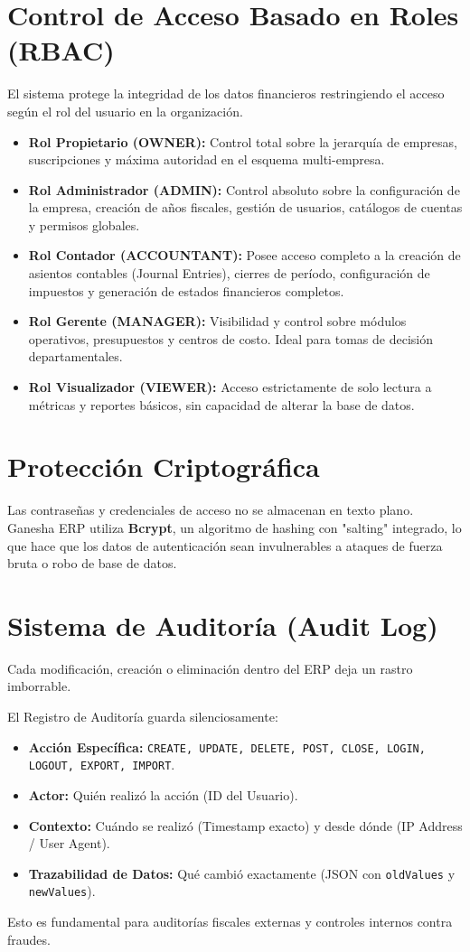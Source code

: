 \documentclass[12pt, a4paper, oneside]{book}
\begin{document}
\section{Control de Acceso Basado en Roles (RBAC)}
El sistema protege la integridad de los datos financieros restringiendo el acceso según el rol del usuario en la organización.
\begin{itemize}
    \item \textbf{Rol Propietario (OWNER):} Control total sobre la jerarquía de empresas, suscripciones y máxima autoridad en el esquema multi-empresa.
    \item \textbf{Rol Administrador (ADMIN):} Control absoluto sobre la configuración de la empresa, creación de años fiscales, gestión de usuarios, catálogos de cuentas y permisos globales.
    \item \textbf{Rol Contador (ACCOUNTANT):} Posee acceso completo a la creación de asientos contables (Journal Entries), cierres de período, configuración de impuestos y generación de estados financieros completos.
    \item \textbf{Rol Gerente (MANAGER):} Visibilidad y control sobre módulos operativos, presupuestos y centros de costo. Ideal para tomas de decisión departamentales.
    \item \textbf{Rol Visualizador (VIEWER):} Acceso estrictamente de solo lectura a métricas y reportes básicos, sin capacidad de alterar la base de datos.
\end{itemize}

\section{Protección Criptográfica}
Las contraseñas y credenciales de acceso no se almacenan en texto plano. Ganesha ERP utiliza \textbf{Bcrypt}, un algoritmo de hashing con "salting" integrado, lo que hace que los datos de autenticación sean invulnerables a ataques de fuerza bruta o robo de base de datos.

\section{Sistema de Auditoría (Audit Log)}
Cada modificación, creación o eliminación dentro del ERP deja un rastro imborrable.
\begin{notainfo}
El Registro de Auditoría guarda silenciosamente:
\begin{itemize}
    \item \textbf{Acción Específica:} \texttt{CREATE, UPDATE, DELETE, POST, CLOSE, LOGIN, LOGOUT, EXPORT, IMPORT}.
    \item \textbf{Actor:} Quién realizó la acción (ID del Usuario).
    \item \textbf{Contexto:} Cuándo se realizó (Timestamp exacto) y desde dónde (IP Address / User Agent).
    \item \textbf{Trazabilidad de Datos:} Qué cambió exactamente (JSON con \texttt{oldValues} y \texttt{newValues}).
\end{itemize}
Esto es fundamental para auditorías fiscales externas y controles internos contra fraudes.
\end{notainfo}
\end{document}
